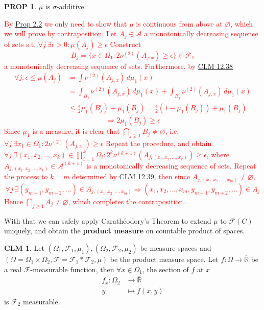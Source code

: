 \documentclass[hidelinks]{article}
\theoremstyle{definition}
\theoremstyle{dotless}
\newtheorem{proposition}{PROP}[section]
\newtheorem{claim}{CLM}[section]
\theoremstyle{remark}
\begin{document}
\begin{proposition}
$\mu$ is $\sigma$-additive.
\end{proposition}
\textcolor{red}{By \hyperref[Prop 2.2]{Prop 2.2} we only need to show that $\mu$ is continuous from above at $\varnothing$, which we will prove by contraposition. Let $A_j\in\mathscr{A}$ a monotonically decreasing sequence of sets s.t. $\forall j\ \exists\epsilon>0:\mu(A_j)\geq\epsilon$ Construct\[B_j=\{x\in\Omega_1:2\nu^{(2)}(A_{j,x})\geq\epsilon\}\in\mathscr{F}_1\]
a monotonically decreasing sequence of sets. Furthermore, by \hyperref[CLM 12.38]{CLM 12.38}
\begin{align*}
\forall j:\epsilon\leq\mu(A_j)&=\int\nu^{(2)}(A_{j,x})\,d\mu_1(x)\\
&=\int_{B_j}\nu^{(2)}(A_{j,x})\,d\mu_1(x)+\int_{B_j^c}\nu^{(2)}(A_{j,x})\,d\mu_1(x)\\
&\leq\frac{\epsilon}{2}\mu_1(B_j^c)+\mu_1(B_j)=\frac{\epsilon}{2}(1-\mu_1(B_j))+\mu_1(B_j)
\end{align*}
\[\Rightarrow2\mu_1(B_j)\geq\epsilon\]
Since $\mu_1$ is a measure, it is clear that $\bigcap\limits_{j\geq1}B_j\neq\varnothing$, i.e. $\forall j\ \exists x_1\in\Omega_1:2\nu^{(2)}(A_{j,x_1})\geq\epsilon$\newline
Repeat the procedure, and obtain $\forall j\ \exists(x_1,x_2,\dots,x_k)\in\prod\limits_{i=1}^k\Omega_i:2^k\nu^{(k+1)}(A_{j,(x_1,x_2,\dots,x_k)})\geq\epsilon$, where $A_{j,(x_1,x_2,\dots,x_k)}\in\mathscr{A}^{(k+1)}$ is a monotonically decreasing sequence of sets.\newline
Repeat the process to $k=m$ determined by \hyperref[CLM 12.39]{CLM 12.39}, then since $A_{j,(x_1,x_2,\dots,x_m)}\neq\varnothing$,
\[\forall j\ \exists(y_{m+1},y_{m+2},\dots)\in A_{j,(x_1,x_2,\dots,x_m)}\Rightarrow(x_1,x_2,\dots,x_m,y_{m+1},y_{m+2},\dots)\in A_j\]
Hence $\bigcap\limits_{j\geq1}A_j\neq\varnothing$, which completes the contraposition.}

\medbreak

With that we can safely apply Carathéodory's Theorem to extend $\mu$ to $\mathscr{F}(C)$ uniquely, and obtain the \textbf{product measure} on countable product of spaces.

\medbreak

\begin{claim}
Let $(\Omega_1,\mathscr{F}_1,\mu_1),(\Omega_2,\mathscr{F}_2,\mu_2)$ be measure spaces and $(\Omega=\Omega_1\times\Omega_2,\mathscr{F}=\mathscr{F}_1\ast\mathscr{F}_2,\mu)$ be the product measure space. Let $f:\Omega\to\overline{\mathbb{R}}$ be a real $\mathscr{F}$-measurable function, then $\forall x\in\Omega_1$, the section of $f$ at $x$
\begin{align*}
f_x:\Omega_2&\to\overline{\mathbb{R}}\\
y&\mapsto f(x,y)
\end{align*}
is $\mathscr{F}_2$ measurable.
\end{claim}
\end{document}
